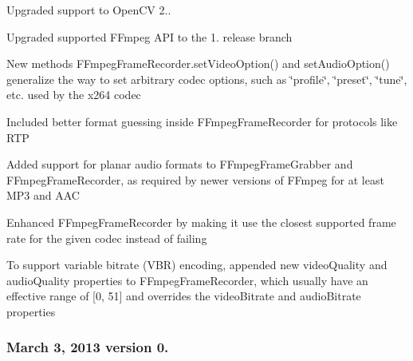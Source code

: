 \begin{DoxyItemize}
\item Upgraded support to Open\+C\+V 2..
\item Upgraded supported F\+Fmpeg A\+P\+I to the 1. release branch
\item New methods {\ttfamily F\+Fmpeg\+Frame\+Recorder.\+set\+Video\+Option()} and {\ttfamily set\+Audio\+Option()} generalize the way to set arbitrary codec options, such as \char`\"{}profile\char`\"{}, \char`\"{}preset\char`\"{}, \char`\"{}tune\char`\"{}, etc. used by the x264 codec
\item Included better format guessing inside {\ttfamily F\+Fmpeg\+Frame\+Recorder} for protocols like R\+T\+P
\item Added support for planar audio formats to {\ttfamily F\+Fmpeg\+Frame\+Grabber} and {\ttfamily F\+Fmpeg\+Frame\+Recorder}, as required by newer versions of F\+Fmpeg for at least M\+P3 and A\+A\+C
\item Enhanced {\ttfamily F\+Fmpeg\+Frame\+Recorder} by making it use the closest supported frame rate for the given codec instead of failing
\item To support variable bitrate (V\+B\+R) encoding, appended new {\ttfamily video\+Quality} and {\ttfamily audio\+Quality} properties to {\ttfamily F\+Fmpeg\+Frame\+Recorder}, which usually have an effective range of \mbox{[}0, 51\mbox{]} and overrides the {\ttfamily video\+Bitrate} and {\ttfamily audio\+Bitrate} properties
\end{DoxyItemize}

\subsubsection*{March 3, 2013 version 0.}


